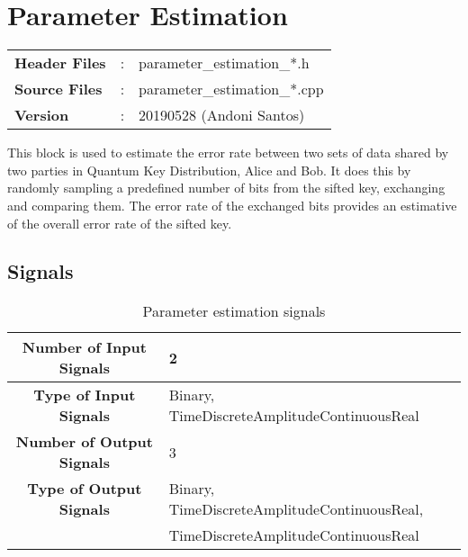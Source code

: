 \clearpage
\graphicspath{{./lib/parameter_estimation/figures/}}
\section{Parameter Estimation}

\begin{tcolorbox}	
	\begin{tabular}{p{2.75cm} p{0.2cm} p{10.5cm}} 	
        \textbf{Header Files}    &:& parameter\_estimation\_*.h \\
		\textbf{Source Files}    &:& parameter\_estimation\_*.cpp \\
        \textbf{Version}        &:& 20190528 (Andoni Santos)
	\end{tabular}
\end{tcolorbox}

\maketitle
This block is used to estimate the error rate between two sets of data shared
by two parties in Quantum Key Distribution, Alice and Bob. It does this by
randomly sampling a predefined number of bits from the sifted key, exchanging
and comparing them. The error rate of the exchanged bits provides an estimative
of the overall error rate of the sifted key. 


\subsection*{Signals}

\begin{table}[h]
	\begin{tabular}{|c|l|}
		\hline
		\textbf{Number of Input Signals} & 2 \\ \hline
        \textbf{Type of Input Signals} & Binary, TimeDiscreteAmplitudeContinuousReal \\ \hline
    	\textbf{Number of Output Signals} & 3 \ \\ \hline
        \textbf{Type of Output Signals} & Binary,
		TimeDiscreteAmplitudeContinuousReal,\\
		& TimeDiscreteAmplitudeContinuousReal \\ \hline
	\end{tabular}
	\caption{Parameter estimation signals}
	\label{table:par_est_signals}
\end{table}

